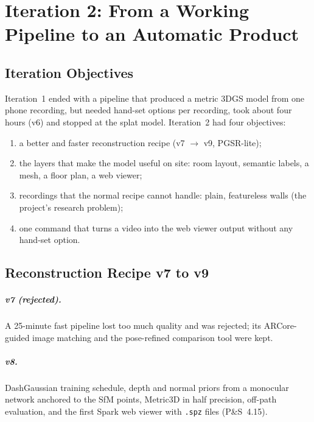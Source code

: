 \chapter{Iteration 2: From a Working Pipeline to an Automatic Product}
\label{ch:iteration2}

\section{Iteration Objectives}
Iteration~1 ended with a pipeline that produced a metric 3DGS model from one phone recording, but needed hand-set
options per recording, took about four hours (v6) and stopped at the splat model. Iteration~2 had four objectives:
\begin{enumerate}
    \item a better and faster reconstruction recipe (v7 $\rightarrow$ v9, PGSR-lite);
    \item the layers that make the model useful on site: room layout, semantic labels, a mesh, a floor plan, a web viewer;
    \item recordings that the normal recipe cannot handle: plain, featureless walls (the project's research problem);
    \item one command that turns a video into the web viewer output without any hand-set option.
\end{enumerate}

\section{Reconstruction Recipe v7 to v9}
\paragraph{v7 (rejected).} A 25-minute fast pipeline lost too much quality and was rejected; its ARCore-guided image
matching and the pose-refined comparison tool were kept.
\paragraph{v8.} DashGaussian training schedule, depth and normal priors from a monocular network anchored to the SfM
points, Metric3D in half precision, off-path evaluation, and the first Spark web viewer with \texttt{.spz} files
(P\&S~4.15).
